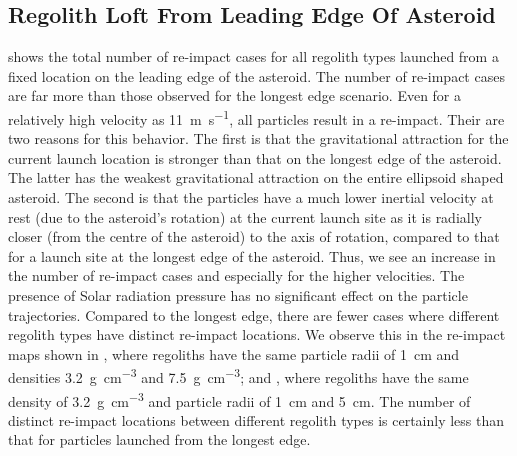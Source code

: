 \subsection{Regolith Loft From Leading Edge Of Asteroid}
\label{sec:general_char_leadingEdge}
 shows the total number of re-impact cases for all regolith types launched from a fixed location on the leading edge of the asteroid. The number of re-impact cases are far more than those observed for the longest edge scenario. Even for a relatively high velocity as \SI{11}{\metre\per\second}, all particles result in a re-impact. Their are two reasons for this behavior. The first is that the gravitational attraction for the current launch location is stronger than that on the longest edge of the asteroid. The latter has the weakest gravitational attraction on the entire ellipsoid shaped asteroid. The second is that the particles have a much lower inertial velocity at rest (due to the asteroid's rotation) at the current launch site as it is radially closer (from the centre of the asteroid) to the axis of rotation, compared to that for a launch site at the longest edge of the asteroid. Thus, we see an increase in the number of re-impact cases and especially for the higher velocities.
%
\newline\newline
%
The presence of Solar radiation pressure has no significant effect on the particle trajectories. Compared to the longest edge, there are fewer cases where different regolith types have distinct re-impact locations. We observe this in the re-impact maps shown in , where regoliths have the same particle radii of \SI{1}{\centi\metre} and densities \SI{3.2}{\gram\per\centi\metre\cubed} and \SI{7.5}{\gram\per\centi\metre\cubed}; and , where regoliths have the same density of \SI{3.2}{\gram\per\centi\metre\cubed} and particle radii of \SI{1}{\centi\metre} and \SI{5}{\centi\metre}. The number of distinct re-impact locations between different regolith types is certainly less than that for particles launched from the longest edge.
